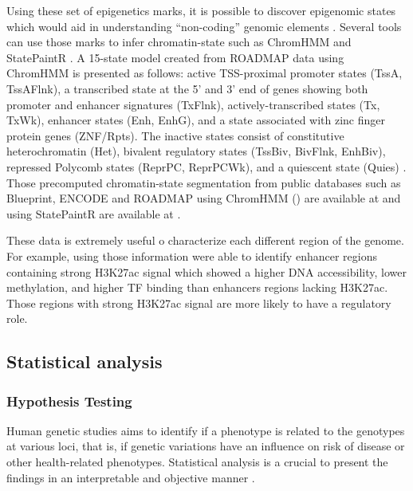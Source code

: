 Using these set of epigenetics marks, it is possible to
 discover epigenomic states which would aid in understanding
 “non-coding” genomic elements \cite{statepaintr}.
 Several tools can use those marks to infer chromatin-state such as ChromHMM \cite{ernst2012chromhmm} and StatePaintR \cite{statepaintr}.
A 15-state model created from ROADMAP data using ChromHMM is presented as follows: active TSS-proximal promoter states (TssA, TssAFlnk), a transcribed state at the 5’ and 3’ end of genes showing both promoter and enhancer signatures (TxFlnk), actively-transcribed states (Tx, TxWk), enhancer states (Enh, EnhG), and a state associated with zinc finger protein genes (ZNF/Rpts). The inactive states consist of constitutive heterochromatin (Het), bivalent regulatory states (TssBiv, BivFlnk, EnhBiv), repressed Polycomb states (ReprPC, ReprPCWk), and a quiescent state (Quies) \cite{kundaje2015integrative}.
Those precomputed chromatin-state segmentation from
 public databases such as Blueprint, ENCODE and ROADMAP using ChromHMM ()
 are available at  and
 using StatePaintR  are available at .

These data is extremely useful o characterize each different region of the genome.
For example, using those information  were able to identify enhancer regions
containing strong H3K27ac signal which showed a higher DNA accessibility,
lower methylation, and higher TF binding than enhancers regions lacking H3K27ac.
Those regions with strong H3K27ac signal are more likely to have a regulatory role.

\subsection{Statistical analysis}

\subsubsection{Hypothesis Testing}

Human genetic studies aims to identify if a phenotype is related to the genotypes
at various loci, that is, if genetic variations have an influence on risk of
disease or other health-related phenotypes.
Statistical analysis is a crucial to present the findings in an
interpretable and objective manner \cite{sham2014statistical}.

